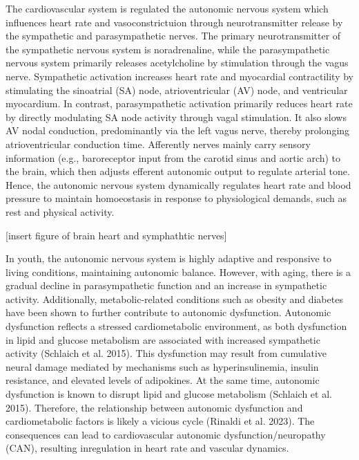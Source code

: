 \documentclass[
  a4paper,
  headsepline=true,
  open=any]{scrbook}
\begin{document}
The cardiovascular system is regulated the autonomic nervous system
which influences heart rate and vasoconstrictuion through
neurotransmitter release by the sympathetic and parasympathetic nerves.
The primary neurotransmitter of the sympathetic nervous system is
noradrenaline, while the parasympathetic nervous system primarily
releases acetylcholine by stimulation through the vagus nerve.
Sympathetic activation increases heart rate and myocardial contractility
by stimulating the sinoatrial (SA) node, atrioventricular (AV) node, and
ventricular myocardium. In contrast, parasympathetic activation
primarily reduces heart rate by directly modulating SA node activity
through vagal stimulation. It also slows AV nodal conduction,
predominantly via the left vagus nerve, thereby prolonging
atrioventricular conduction time. Afferently nerves mainly carry sensory
information (e.g., baroreceptor input from the carotid sinus and aortic
arch) to the brain, which then adjusts efferent autonomic output to
regulate arterial tone. Hence, the autonomic nervous system dynamically
regulates heart rate and blood pressure to maintain homoeostasis in
response to physiological demands, such as rest and physical activity.

{[}insert figure of brain heart and symphathtic nerves{]}

In youth, the autonomic nervous system is highly adaptive and responsive
to living conditions, maintaining autonomic balance. However, with
aging, there is a gradual decline in parasympathetic function and an
increase in sympathetic activity. Additionally, metabolic-related
conditions such as obesity and diabetes have been shown to further
contribute to autonomic dysfunction. Autonomic dysfunction reflects a
stressed cardiometabolic environment, as both dysfunction in lipid and
glucose metabolism are associated with increased sympathetic activity
(Schlaich et al. 2015). This dysfunction may result from cumulative
neural damage mediated by mechanisms such as hyperinsulinemia, insulin
resistance, and elevated levels of adipokines. At the same time,
autonomic dysfunction is known to disrupt lipid and glucose metabolism
(Schlaich et al. 2015). Therefore, the relationship between autonomic
dysfunction and cardiometabolic factors is likely a vicious cycle
(Rinaldi et al. 2023). The consequences can lead to cardiovascular
autonomic dysfunction/neuropathy (CAN), resulting inregulation in heart
rate and vascular dynamics.
\end{document}
